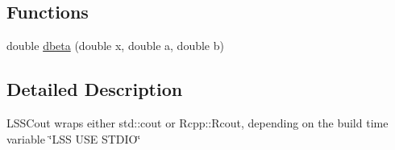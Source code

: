 \subsection*{Functions}
\begin{DoxyCompactItemize}
\item 
double \hyperlink{namespaceSpatialSEIR_a5111a2bb19b97c248bbd9c39e8269f19}{dbeta} (double x, double a, double b)
\end{DoxyCompactItemize}


\subsection{Detailed Description}
L\-S\-S\-Cout wraps either std\-::cout or Rcpp\-::\-Rcout, depending on the build time variable \char`\"{}\-L\-S\-S U\-S\-E S\-T\-D\-I\-O\char`\"{} 

